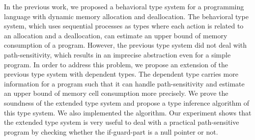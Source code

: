 \label{sec:abstraction}
In the previous work, we proposed a behavioral type system for a
programming language with dynamic memory allocation and deallocation.
The behavioral type system, which uses sequential processes as types
where each action is related to an allocation and a deallocation, can
estimate an upper bound of memory consumption of a program.  However,
the previous type system did not deal with path-sensitivity, which
results in an imprecise abstraction even for a simple program.  In
order to address this problem, we propose an extension of the previous
type system with dependent types.  The dependent type carries more
information for a program such that it can handle path-sensitivity and
estimate an upper bound of memory cell consumption more precisely.  We
prove the soundness of the extended type system and propose a type
inference algorithm of this type system.  We also implemented the
algorithm.  Our experiment shows that the extended type system is very
useful to deal with a practical path-sensitive program by checking
whether the if-guard-part is a null pointer or not.
